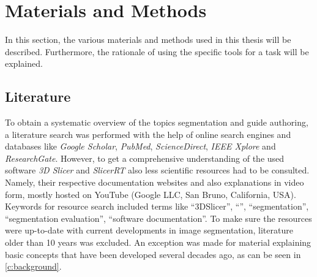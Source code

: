 
\chapter{Materials and Methods}\label{c:materialsNmethods}

In this section, the various materials and methods used in this thesis will be described.
Furthermore, the rationale of using the specific tools for a task will be explained.

\section{Literature}\label{s:literature}
To obtain a systematic overview of the topics \mct\space segmentation and guide authoring, a literature search was performed with the help of online search engines and databases like \textit{Google Scholar}, \textit{PubMed}, \textit{ScienceDirect}, \textit{IEEE Xplore} and \textit{ResearchGate}.
However, to get a comprehensive understanding of the used software \textit{3D Slicer} and \textit{SlicerRT} also less scientific resources had to be consulted.
Namely, their respective documentation websites and also explanations in video form, mostly hosted on YouTube (Google LLC, San Bruno, California, USA).
Keywords for resource search included terms like ``3DSlicer'', ``\mct'', ``segmentation'', ``segmentation evaluation'', ``software documentation''.
To make sure the resources were up-to-date with current developments in image segmentation, literature older than 10 years was excluded.
An exception was made for material explaining basic concepts that have been developed several decades ago, as can be seen in \cref{c:background}.


